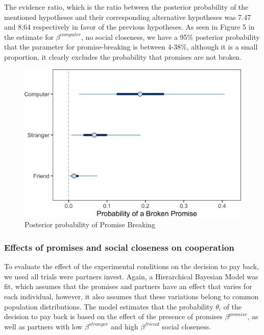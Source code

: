 \documentclass[smallextended]{svjour3}       %
\begin{document}
The evidence ratio, which is the ratio between the posterior probability
of the mentioned hypotheses and their corresponding alternative
hypotheses was 7.47 and 8.64 respectively in favor of the previous
hypotheses. As seen in Figure 5 in the estimate for
\(\beta^{computer}\), no social closeness, we have a 95\% posterior
probability that the parameter for promise-breaking is between 4-38\%,
although it is a small proportion, it clearly excludes the probability
that promises are not broken.

\begin{figure}

{\centering \includegraphics[width=0.8\linewidth]{behavioral-promises_files/figure-latex/fig3-1} 

}

\caption{Posterior probability of Promise Breaking}\label{fig:fig3}
\end{figure}

\hypertarget{effects-of-promises-and-social-closeness-on-cooperation}{%
\subsubsection{Effects of promises and social closeness on
cooperation}\label{effects-of-promises-and-social-closeness-on-cooperation}}

To evaluate the effect of the experimental conditions on the decision to
pay back, we used all trials were partners invest. Again, a Hierarchical
Bayesian Model was fit, which assumes that the promises and partners
have an effect that varies for each individual, however, it also assumes
that these variations belong to common population distributions. The
model estimates that the probability \(\theta_i\) of the decision to pay
back is based on the effect of the presence of promises
\(\beta^{promise}\), as well as partners with low \(\beta^{stranger}\)
and high \(\beta^{friend}\) social closeness.
\end{document}
